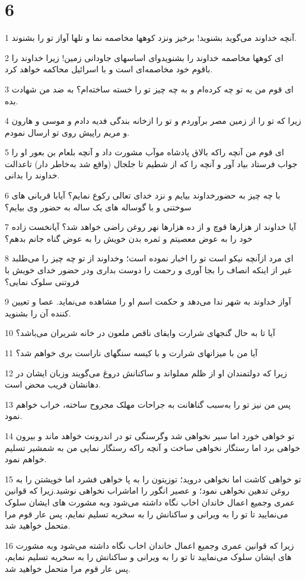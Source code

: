\chapter{6}

\par 1 آنچه خداوند می‌گوید بشنوید! برخیز ونزد کوهها مخاصمه نما و تلها آواز تو را بشنوند.
\par 2 ‌ای کوهها مخاصمه خداوند را بشنویدو‌ای اساسهای جاودانی زمین! زیرا خداوند را باقوم خود مخاصمه‌ای است و با اسرائیل محاکمه خواهد کرد.
\par 3 ‌ای قوم من به تو چه کرده‌ام و به چه چیز تو را خسته ساخته‌ام؟ به ضد من شهادت بده.
\par 4 زیرا که تو را از زمین مصر برآوردم و تو را ازخانه بندگی فدیه دادم و موسی و هارون و مریم راپیش روی تو ارسال نمودم.
\par 5 ‌ای قوم من آنچه راکه بالاق پادشاه موآب مشورت داد و آنچه بلعام بن بعور او را جواب فرستاد بیاد آور و آنچه را که از شطیم تا جلجال (واقع شد به‌خاطر دار) تاعدالت خداوند را بدانی.
\par 6 با چه چیز به حضورخداوند بیایم و نزد خدای تعالی رکوع نمایم؟ آیابا قربانی های سوختنی و با گوساله های یک ساله به حضور وی بیایم؟
\par 7 آیا خداوند از هزارها قوچ و از ده هزارها نهر روغن راضی خواهد شد؟ آیانخست زاده خود را به عوض معصیتم و ثمره بدن خویش را به عوض گناه جانم بدهم؟
\par 8 ‌ای مرد ازآنچه نیکو است تو را اخبار نموده است؛ وخداوند از تو چه چیز را می‌طلبد غیر از اینکه انصاف را بجا آوری و رحمت را دوست بداری ودر حضور خدای خویش با فروتنی سلوک نمایی؟
\par 9 آواز خداوند به شهر ندا می‌دهد و حکمت اسم او را مشاهده می‌نماید. عصا و تعیین کننده آن را بشنوید.
\par 10 آیا تا به حال گنجهای شرارت وایفای ناقص ملعون در خانه شریران می‌باشد؟
\par 11 آیا من با میزانهای شرارت و با کیسه سنگهای ناراست بری خواهم شد؟
\par 12 زیرا که دولتمندان او از ظلم مملواند و ساکنانش دروغ می‌گویند وزبان ایشان در دهانشان فریب محض است.
\par 13 پس من نیز تو را به‌سبب گناهانت به جراحات مهلک مجروح ساخته، خراب خواهم نمود.
\par 14 تو خواهی خورد اما سیر نخواهی شد وگرسنگی تو در اندرونت خواهد ماند و بیرون خواهی برد اما رستگار نخواهی ساخت و آنچه راکه رستگار نمایی من به شمشیر تسلیم خواهم نمود.
\par 15 تو خواهی کاشت اما نخواهی دروید؛ توزیتون را به پا خواهی فشرد اما خویشتن را به روغن تدهین نخواهی نمود؛ و عصیر انگور را اماشراب نخواهی نوشید.زیرا که قوانین عمری وجمیع اعمال خاندان اخاب نگاه داشته می‌شود وبه مشورت های ایشان سلوک می‌نمایید تا تو را به ویرانی و ساکنانش را به سخریه تسلیم نمایم، پس عار قوم مرا متحمل خواهید شد.
\par 16 زیرا که قوانین عمری وجمیع اعمال خاندان اخاب نگاه داشته می‌شود وبه مشورت های ایشان سلوک می‌نمایید تا تو را به ویرانی و ساکنانش را به سخریه تسلیم نمایم، پس عار قوم مرا متحمل خواهید شد.

